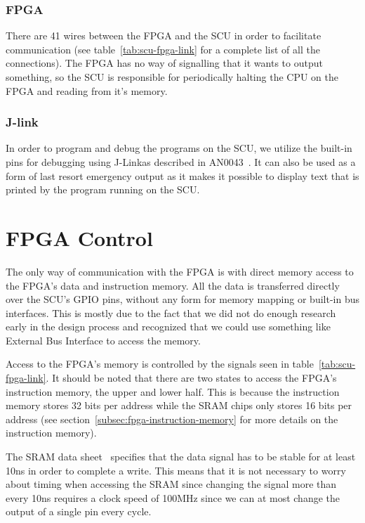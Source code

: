 \subsubsection{FPGA}
There are 41 wires between the FPGA and the SCU in order to facilitate communication (see table~\ref{tab:scu-fpga-link} for a complete list of all the connections).
The FPGA has no way of signalling that it wants to output something, so the SCU is responsible for periodically halting the CPU on the FPGA and reading from it's memory.

\subsubsection{J-link}
In order to program and debug the programs on the SCU, we utilize the built-in pins for debugging using J-Link\texttrademark as described in AN0043~\cite{an0043}.
It can also be used as a form of last resort emergency output as it makes it possible to display text that is printed by the program running on the SCU.

\section{FPGA Control}
The only way of communication with the FPGA is with direct memory access to the FPGA's data and instruction memory.
All the data is transferred directly over the SCU's GPIO pins, without any form for memory mapping or built-in bus interfaces.
This is mostly due to the fact that we did not do enough research early in the design process and recognized that we could use something like External Bus Interface to access the memory.

Access to the FPGA's memory is controlled by the signals seen in table~\ref{tab:scu-fpga-link}.
It should be noted that there are two states to access the FPGA's instruction memory, the upper and lower half.
This is because the instruction memory stores 32 bits per address while the SRAM chips only stores 16 bits per address (see section~\ref{subsec:fpga-instruction-memory} for more details on the instruction memory).

The SRAM data sheet~\cite{sram-datasheet} specifies that the data signal has to be stable for at least 10ns in order to complete a write.
This means that it is not necessary to worry about timing when accessing the SRAM since changing the signal more than every 10ns requires a clock speed of 100MHz since we can at most change the output of a single pin every cycle.


